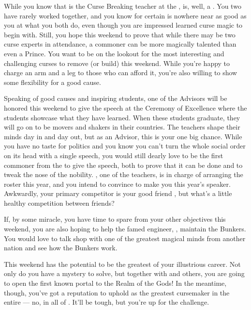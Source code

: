 \documentclass[char]{GL2020}
\begin{document}
While you know that \cPrince{\intro} is the Curse Breaking teacher at the \pSc{}, \cPrince{} is, well, a \cPrince{\Heir}. You two have rarely worked together, and you know for certain \cPrince{} is nowhere near as good as you at what you both do, even though you are impressed \cPrince{\they} learned curse magic to begin with. Still, you hope this weekend to prove that while there may be two curse experts in attendance, a commoner can be more magically talented than even a Prince. You want to be on the lookout for the most interesting and challenging curses to remove (or build) this weekend. While you're happy to charge an arm and a leg to those who can afford it, you're also willing to show some flexibility for a good cause.

Speaking of good causes and inspiring students, one of the Advisors will be honored this weekend to give the speech at the Ceremony of Excellence where the students showcase what they have learned. When these students graduate, they will go on to be movers and shakers in their countries. The teachers shape their minds day in and day out, but as an Advisor, this is your one big chance. While you have no taste for politics and you know you can't turn the whole social order on its head with a single speech, you would still dearly love to be the first commoner from the \pFarm{} to give the speech, both to prove that it can be done and to tweak the nose of the nobility. \cMusic{\intro}, one of the teachers, is in charge of arranging the roster this year, and you intend to convince \cMusic{\them} to make you this year's speaker. Awkwardly, your primary competitor is your good friend \cHedonist{}, but what's a little healthy competition between friends?

If, by some miracle, you have time to spare from your other objectives this weekend, you are also hoping to help the famed \pShippie{} engineer, \cBunker{\intro}, maintain the Bunkers. You would love to talk shop with one of the greatest magical minds from another nation and see how the Bunkers work.

This weekend has the potential to be the greatest of your illustrious career. Not only do you have a mystery to solve, but together with \cFlowPriest{} and others, you are going to open the first known portal to the Realm of the Gods! In the meantime, though, you've got a reputation to uphold as the greatest cursemaker in the entire \pFarm{} — no, in all of \pEarth{}. It'll be tough, but you're up for the challenge.
\end{document}
